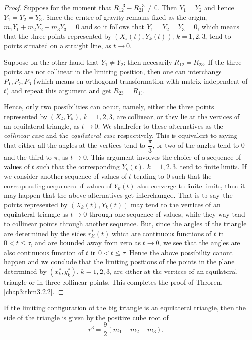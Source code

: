 \begin{proof}
Suppose for the moment that $R^{-3}_{12} - R^{-3}_{23} \neq 0$. Then
$Y_1 = Y_2$ and hence $Y_1 = Y_2 = Y_3$. Since the centre of gravity
remains fixed at the origin, $m_1 Y_1  + m_2 Y_2 + m_3 Y_3 = 0 $ and
so it follows that $Y_1 = Y_2 = Y_3 = 0$, which means that the three
points represented by $(X_k (t), Y_k(t))$, $k = 1,2,3$, tend to points
situated on a straight line, as $t \to 0$. 

Suppose on the other hand that $Y_1 \neq Y_2$; then necesarily $R_{12}
= R_{23}$. If the three points are not collinear in the limiting
position, then one can interchange $P_1, P_2, P_3$ (which means on
orthogonal transformation with matrix independent of $t$) and repeat
this argument and get $R_{23} = R_{13}$.  

Hence, only two possibilities can occur, namely, either the three
points represented by $(X_k, Y_k)$, $k = 1,2,3$, are collinear, or
they lie at the vertices of an equilateral triangle, as $t \to 0$. We
shall\pageoriginale refer to these alternatives as the {\em collinear
  case} and the {\em equilateral case} respectively. This is
equivalent to saying that either all the angles at the vertices tend
to $\dfrac{\pi}{3}$, or two of the angles tend to 0 and the third to
$\pi$, as $t \to 0$. This argument involves the choice of a sequence
of values of $t$ such that the corresponding $Y_k(t)$, $k = 1,2,3$,
tend to finite limits. If we consider another sequence of values of
$t$ tending to 0 such that the corresponding sequences of values of
$Y_k(t)$ also converge to finite limits, then it may happen that the
above alternatives get interchanged. That is to say, the points
represented by $(X_k(t), Y_k (t))$ may tend to the vertices of an
equilateral triangle as $t \to 0$ through one sequence of values,
while they way tend to collinear points through another sequence. But,
since the angles of the triangle are determined by the sides
$r^*_{kl}(t)$ which are continuous functions of $t$ in $0 < t \leq
\tau$, and are bounded away from zero as $t \to 0$, we see that the
angles are also continuous function of $t$ in $0 <t\leq \tau$. Hence
the above possibility canont happen and we conclude that the limiting
positions of the points in the plane determined by $(x^*_k, y^*_k)$,
$k = 1,2,3$, are either at the vertices of an equilateral triangle or
in three collinear points.  This completes the proof of Theorem
\ref{chap3:thm3.2.2}. 
\end{proof}

\begin{subtheorem}\label{chap3:thm3.2.3}
If the limiting configuration of the big triangle is an equilateral
triangle, then the side of the triangle is given by the positive cube
root of  
\begin{equation*}
r^3 = \frac{9}{2} (m_1 + m_2 + m_3). \tag{3.2.23}\label{chap3:eq3.2.23}
\end{equation*}
\end{subtheorem}

